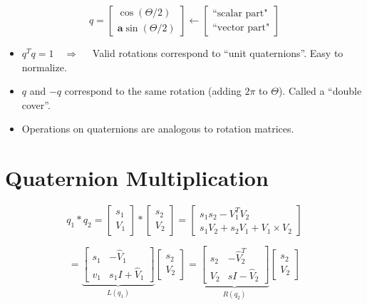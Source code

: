 \documentclass[11pt]{article}
\begin{document}
\[
q =
\begin{bmatrix}
    \cos{(\Theta/2)} \\
    \mathbf{a} \sin{(\Theta/2)}
\end{bmatrix}
\leftarrow \begin{bmatrix}
    \text{``scalar part"} \\
    \text{``vector part"}
\end{bmatrix}
\]

\begin{itemize}
    \item $q^T q = 1 \quad \Rightarrow \quad$ Valid rotations correspond to ``unit quaternions''. Easy to normalize.
    \item $q$ and $-q$ correspond to the same rotation (adding $2\pi$ to $\Theta$). Called a ``double cover''.
    \item Operations on quaternions are analogous to rotation matrices.
\end{itemize}

\section*{Quaternion Multiplication}

\[
q_1 * q_2 =
\begin{bmatrix}
    s_1 \\ V_1
\end{bmatrix}
*
\begin{bmatrix}
    s_2 \\ V_2
\end{bmatrix}
=
\begin{bmatrix}
    s_1 s_2 - V_1^T V_2 \\
    s_1 V_2 + s_2 V_1 + V_1 \times V_2
\end{bmatrix}
\]

\[
=
\underbrace{
\begin{bmatrix}
    s_1 &- \hat{V}_1\\
    v_1 & s_1I+\hat{V}_1
\end{bmatrix}}_{L(q_1)}
\begin{bmatrix}
    s_2 \\ V_2
\end{bmatrix}
=
\underbrace{
\begin{bmatrix}
    s_2 & - \hat{V}_2^T \\
    V_2 & sI - \hat{V}_2
\end{bmatrix}
}_{R(q_2)}
\begin{bmatrix}
    s_2 \\ V_2
\end{bmatrix}
\]
\end{document}
